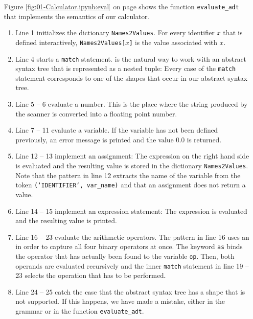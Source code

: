 \noindent
Figure \ref{fig:01-Calculator.ipynb:eval} on page \pageref{fig:01-Calculator.ipynb:eval} shows the
function \texttt{evaluate\_adt} that implements the semantics of our calculator.
\begin{enumerate}
\item Line 1 initializes the dictionary \texttt{Names2Values}.  For every identifier $x$ that is defined
      interactively, \texttt{Names2Values[$x$]} is the value associated with $x$.
\item Line 4 starts a \texttt{match} statement.   is the natural way to
      work with an abstract syntax tree that is represented as a nested tuple:  Every case of the
      \texttt{match} statement corresponds to one of the shapes that occur in our abstract syntax tree.
\item Line 5 -- 6 evaluate a number.  This is the place where the string produced by the scanner is
      converted into a floating point number.
\item Line 7 -- 11 evaluate a variable.  If the variable has not been defined previously, an error message
      is printed and the value $0.0$ is returned.
\item Line 12 -- 13 implement an assignment:  The expression on the right hand side is evaluated and the
      resulting value is stored in the dictionary \texttt{Names2Values}.  Note that the pattern in line 12
      extracts the name of the variable from the token \texttt{('IDENTIFIER', var\_name)} and that an
      assignment does not return a value.
\item Line 14 -- 15 implement an expression statement:  The expression is evaluated and the resulting value
      is printed.
\item Line 16 -- 23 evaluate the arithmetic operators.  The pattern in line 16 uses an  in
      order to capture all four binary operators at once.  The keyword \texttt{as} binds the operator that
      has actually been found to the variable \texttt{op}.  Then, both operands are evaluated recursively
      and the inner \texttt{match} statement in line 19 -- 23 selects the operation that has to be
      performed.
\item Line 24 -- 25 catch the case that the abstract syntax tree has a shape that is not supported.  If
      this happens, we have made a mistake, either in the grammar or in the function
      \texttt{evaluate\_adt}.
\end{enumerate}
\FloatBarrier

